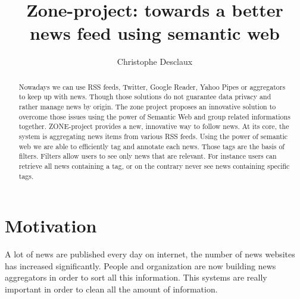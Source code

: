 \documentclass{llncs}
\begin{document}
%
\frontmatter          %
%
\pagestyle{headings}  %
%

\mainmatter              %
%
\title{Zone-project: towards a better news feed using semantic web}
%
%
\author{Christophe Desclaux}
%
%
%

\maketitle

\begin{abstract}%
Nowadays we can use RSS feeds, Twitter, Google Reader, Yahoo Pipes or aggregators to keep up with news. Though those solutions do not guarantee data privacy and rather manage news by origin. The zone project proposes an innovative solution to overcome those issues using the power of Semantic Web and group related informations together.
ZONE-project provides a new, innovative way to follow news. At its core, the system is aggregating news items from various RSS feeds.
Using the power of semantic web we are able to efficiently tag and annotate each news. Those tags are the basis of filters.
Filters allow users to see only news that are relevant. For instance users can retrieve all news containing a tag, or on the contrary never see news containing specific tags.


{}
\end{abstract}
%
\section{Motivation}
%
A lot of news are published every day on internet, the number of news websites has increased significantly. People and organization are now building news aggregators in order to sort all this information. This systems are really important in order to clean all the amount of information.
\end{document}
